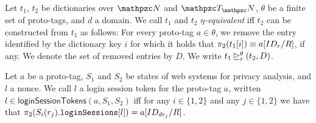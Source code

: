   \begin{definition}
    Let $t_1$, $t_2$ be dictionaries over $\nonces$ and $\terms$,
    $\theta$ be a finite set of proto-tags, and $d$ a domain. We call
    $t_1$ and $t_2$ \emph{$\eta$-equivalent} iff $t_2$ can be
    constructed from $t_1$ as follows: For every proto-tag
    $a \in \theta$, we remove the entry identified by the dictionary key
    $i$ for which it holds that $\proj{2}{t_1[i]} \equiv a[ID_r/ R]$, if
    any. We denote the set of removed entries by $D$. We write
    $\logsessminus{t_1}{t_2}{\theta}{r}{D}$.
  \end{definition}
  
  \begin{definition}
    Let $a$ be a proto-tag, $S_1$ and $S_2$ be states of \uppresso web
    systems for privacy analysis, and $l$ a nonce. We call $l$ a login
    session token for the proto-tag $a$, written
    $l \in \mathsf{loginSessionTokens}(a,S_1,S_2)$ iff for any
    $i \in \{1,2\}$ and any $j \in \{1,2\}$ we have that
    $\proj{2}{S_i(r_j).\str{loginSessions}[l]} = a[ID_{dr_j}/ R]$.
  \end{definition}
  
